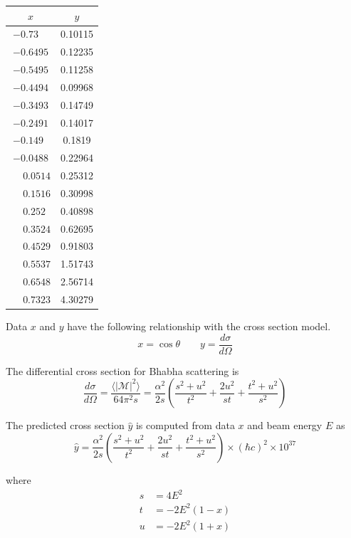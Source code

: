 \documentclass[12pt]{article}
\begin{document}
\begin{center}
\begin{tabular}{|c|c|}
\hline
$x$ & $y$\\
\hline
$-0.73\phantom{00}$ & 0.10115\\
$-0.6495$ & 0.12235\\
$-0.5495$ & 0.11258\\
$-0.4494$ & 0.09968\\
$-0.3493$ & 0.14749\\
$-0.2491$ & 0.14017\\
$-0.149\phantom{0}$ & 0.1819\phantom{0}\\
$-0.0488$ & 0.22964\\
$\phantom{+}0.0514$ & 0.25312\\
$\phantom{+}0.1516$ & 0.30998\\
$\phantom{+}0.252\phantom{0}$ & 0.40898\\
$\phantom{+}0.3524$ & 0.62695\\
$\phantom{+}0.4529$ & 0.91803\\
$\phantom{+}0.5537$ & 1.51743\\
$\phantom{+}0.6548$ & 2.56714\\
$\phantom{+}0.7323$ & 4.30279\\
\hline
\end{tabular}
\end{center}

\noindent
Data $x$ and $y$ have the following relationship
with the cross section model.
\begin{equation*}
x=\cos\theta
\qquad
y=\frac{d\sigma}{d\Omega}
\end{equation*}

\noindent
The differential cross section for Bhabha scattering is
\begin{equation*}
\frac{d\sigma}{d\Omega}
=\frac{\langle|\mathcal{M}|^2\rangle}{64\pi^2s}
=\frac{\alpha^2}{2s}
\left(\frac{s^2+u^2}{t^2}+\frac{2u^2}{st}+\frac{t^2+u^2}{s^2}\right)
\end{equation*}

\noindent
The predicted cross section $\hat{y}$ is computed from data $x$ and beam energy $E$ as
\begin{equation*}
\hat{y}
=\frac{\alpha^2}{2s}
\left(\frac{s^2+u^2}{t^2}+\frac{2u^2}{st}+\frac{t^2+u^2}{s^2}\right)
\times(\hbar c)^2
\times10^{37}
\end{equation*}

\noindent
where
\begin{align*}
s&=4E^2
\\
t&=-2E^2(1-x)
\\
u&=-2E^2(1+x)
\end{align*}
\end{document}

